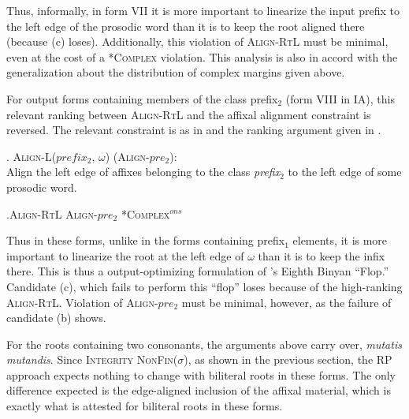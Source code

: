 \documentclass[12pt,twoside,letterpaper]{article}
\begin{document}
Thus, informally, in form VII it is more important to linearize the input prefix to the left edge of the prosodic word than it is to keep the root aligned there (because (c) loses). Additionally, this violation of \textsc{Align-RtL} must be minimal, even at the cost of a *\textsc{Complex} violation. This analysis is also in accord with the generalization about the distribution of complex margins given above.

For output forms containing members of the class prefix$_2$ (form VIII in IA), this relevant ranking between \textsc{Align-RtL} and the affixal alignment constraint is reversed. The relevant constraint is as in \Next and the ranking argument given in \NNext.

\ex. \textsc{Align-L}($prefix_2$, $\omega$) (\textsc{Align-}$pre_2$):\\Align the left edge of affixes belonging to the class \emph{prefix}$_2$ to the left edge of some prosodic word.

\ex.\label{tab:formviii-unmarked}\textsc{Align-RtL} \OTdom \textsc{Align}-$pre_2$ \OTdom \textsc{*Complex}$^{ons}$\\\begin{OTtableau}{3}
  \end{OTtableau}

Thus in these forms, unlike in the forms containing prefix$_1$ elements, it is more important to linearize the root at the left edge of $\omega$ than it is to keep the infix there. This is thus a output-optimizing formulation of \cite{mccarthy81}'s Eighth Binyan ``Flop.'' Candidate (c), which fails to perform this ``flop'' loses because of the high-ranking \textsc{Align-RtL}. Violation of \textsc{Align-}$pre_2$ must be minimal, however, as the failure of candidate (b) shows.

For the roots containing two consonants, the arguments above carry over, \emph{mutatis mutandis}. Since \textsc{Integrity} \OTdom \textsc{NonFin}($\sigma$), as shown in the previous section, the RP approach expects nothing to change with biliteral roots in these forms. The only difference expected is the edge-aligned inclusion of the affixal material, which is exactly what is attested for biliteral roots in these forms. 
\end{document}
